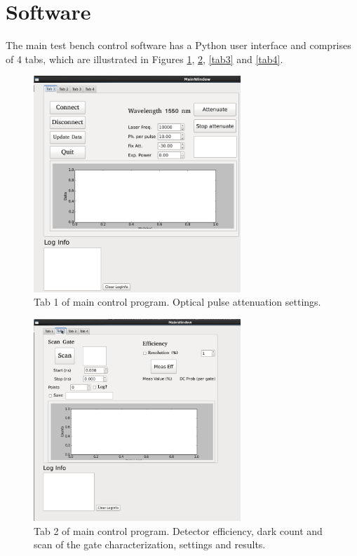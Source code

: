 \documentclass{article}
\begin{document}

\section{Software}

The main test bench control software has a Python user interface and comprises of 4 tabs, which are illustrated in Figures \ref{tab1}, \ref{tab2}, \ref{tab3} and \ref{tab4}. 

\begin{figure}
\centering
\includegraphics[width=7.8cm]{images/tab1.png}
\caption{Tab 1 of main control program. Optical pulse attenuation settings.}
\label{tab1}
\end{figure}

\begin{figure}
\centering
\includegraphics[width=7.8cm]{images/tab2.png}
\caption{Tab 2 of main control program. Detector efficiency, dark count and scan of the gate characterization, settings and results.}
\label{tab2}
\end{figure}
\end{document}
